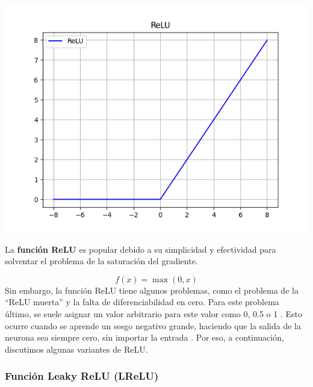 \begin{minipage}{0.35\textwidth}
    \includegraphics[width=\textwidth]{img/ReLU.png}
    \label{img: relu}
\end{minipage}
\begin{minipage}{0.05\textwidth}
\textbf{ }
\end{minipage}
\begin{minipage}{0.6\textwidth}
    La \textbf{función ReLU} es popular debido a su simplicidad y efectividad para solventar el problema de la saturación del gradiente.

\begin{equation}
    f(x) = \max(0, x)
\end{equation}
Sin embargo, la función ReLU tiene algunos problemas, como el problema de la ``ReLU muerta'' \citep{maas2013rectifier} y la falta de diferenciabilidad en cero. Para este problema último, se suele asignar un valor arbitrario para este valor como 0, 0.5 o 1 \citep{pajares2021aprendizaje}. Esto ocurre cuando se aprende un sesgo negativo grande, haciendo que la salida de la neurona sea siempre cero, sin importar la entrada \citep{apicella2021survey}. Por eso, a continuación, discutimos algunas variantes de ReLU.
\end{minipage}


\subsubsection*{Función Leaky ReLU (LReLU)}

